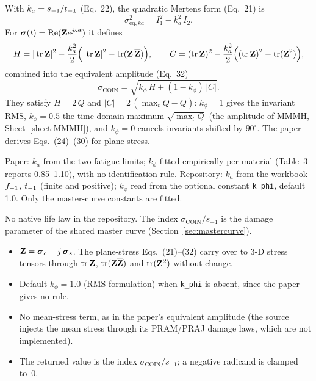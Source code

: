  With $k_a=s_{-1}/t_{-1}$ (Eq.~22), the quadratic Mertens form (Eq.~21) is
\begin{equation}
\sigma_{\mathrm{eq},ka}^2 = I_1^2 - k_a^2\,I_2 .
\label{eq:coin-q}
\end{equation}
For $\boldsymbol\sigma(t)=\operatorname{Re}(\mathbf Z e^{j\omega t})$ it defines
\begin{equation}
H = |\operatorname{tr}\mathbf Z|^2 - \frac{k_a^2}{2}\Bigl(|\operatorname{tr}\mathbf Z|^2 - \operatorname{tr}(\mathbf Z\,\overline{\mathbf Z})\Bigr) ,
\qquad
C = (\operatorname{tr}\mathbf Z)^2 - \frac{k_a^2}{2}\Bigl((\operatorname{tr}\mathbf Z)^2 - \operatorname{tr}(\mathbf Z^2)\Bigr) ,
\label{eq:coin-hc}
\end{equation}
combined into the equivalent amplitude (Eq.~32)
\begin{equation}
\sigma_{\mathrm{COIN}} = \sqrt{k_\phi\,H + (1-k_\phi)\,|C|} .
\label{eq:coin-main}
\end{equation}
They satisfy $H=2\,\overline Q$ and $|C|=2\,(\max_t Q-\overline Q)$: $k_\phi=1$ gives the invariant RMS,
$k_\phi=0.5$ the time-domain maximum $\sqrt{\max_t Q}$ (the amplitude of MMMH,
Sheet~\ref{sheet:MMMH}), and $k_\phi=0$ cancels invariants shifted by $90^\circ$. The paper derives
Eqs.~(24)--(30) for plane stress.

 Paper: $k_a$ from the two fatigue limits; $k_\phi$ fitted empirically
per material (Table~3 reports 0.85--1.10), with no identification rule. Repository: $k_a$ from the
workbook $f_{-1}$, $t_{-1}$ (finite and positive); $k_\phi$ read from the optional constant
\texttt{k\_phi}, default 1.0. Only the master-curve constants are fitted.

 No native life law in the repository. The index $\sigma_{\mathrm{COIN}}/s_{-1}$ is the
damage parameter of the shared master curve (Section~\ref{sec:mastercurve}).

\begin{itemize}
\item $\mathbf Z=\boldsymbol\sigma_c-j\,\boldsymbol\sigma_s$. The plane-stress Eqs.~(21)--(32) carry over to 3-D stress tensors through
  $\operatorname{tr}\mathbf Z$, $\operatorname{tr}(\mathbf Z\overline{\mathbf Z})$ and $\operatorname{tr}(\mathbf Z^2)$ without change.
\item Default $k_\phi=1.0$ (RMS formulation) when \texttt{k\_phi} is absent, since the paper gives no rule.
\item No mean-stress term, as in the paper's equivalent amplitude (the source injects the mean stress
  through its PRAM/PRAJ damage laws, which are not implemented).
\item The returned value is the index $\sigma_{\mathrm{COIN}}/s_{-1}$; a negative radicand is clamped
  to~0.
\end{itemize}

